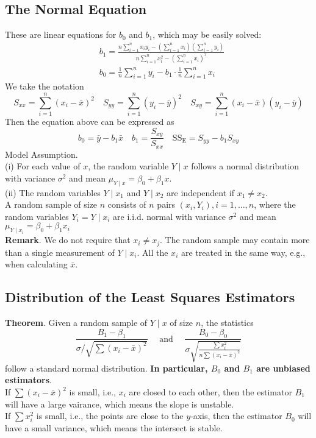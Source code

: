 \documentclass[a4paper,12pt]{article}
\begin{document}
\subsection{The Normal Equation}
These are linear equations for $b_0$ and $b_1$, which may be easily solved:
\begin{equation}
\begin{aligned}
& b_1=\frac{n \sum_{i=1}^n x_i y_i-\left(\sum_{i=1}^n x_i\right)\left(\sum_{i=1}^n y_i\right)}{n \sum_{i=1}^n x_i^2-\left(\sum_{i=1}^n x_i\right)^2} \\
& b_0=\frac{1}{n} \sum_{i=1}^n y_i-b_1 \cdot \frac{1}{n} \sum_{i=1}^n x_i
\end{aligned}
\end{equation}
We take the notation
$$
S_{xx}=\sum_{i=1}^n(x_i-\bar{x})^2 \quad S_{yy}=\sum_{i=1}^n(y_i-\bar{y})^2 \quad S_{xy} =\sum_{i=1}^n(x_i-\bar{x})(y_i-\bar{y})
$$
Then the equation above can be expressed as
\begin{equation}
    b_0=\bar{y}-b_1\bar{x} \quad b_1=\dfrac{S_{xy}}{S_{xx}} \quad \operatorname{SS_E}=S_{yy}-b_1S_{xy}
\end{equation}
Model Assumption.\\
(i) For each value of $x$, the random variable $Y \mid x$ follows a normal distribution with variance $\sigma^2$ and mean $\mu_{Y \mid x}=\beta_0+\beta_1 x$.\\
(ii) The random variables $Y \mid x_1$ and $Y \mid x_2$ are independent if $x_1 \neq x_2$.\\
A random sample of size $n$ consists of $n$ pairs $\left(x_i, Y_i\right), i=1, \ldots, n$, where the random variables $Y_i=Y \mid x_i$ are i.i.d. normal with variance $\sigma^2$ and mean $\mu_{Y \mid x_i}=\beta_0+\beta_1 x_i$\\
\textbf{Remark}. We do not require that $x_i \neq x_j$. The random sample may contain more than a single measurement of $Y \mid x_i$. All the $x_i$ are treated in the same way, e.g., when calculating $\bar{x}$.
\subsection{Distribution of the Least Squares Estimators}
\textbf{Theorem}. Given a random sample of $Y \mid x$ of size $n$, the statistics
\begin{equation}
\frac{B_1-\beta_1}{\sigma / \sqrt{\sum\left(x_i-\bar{x}\right)^2}} \quad \text { and } \quad \frac{B_0-\beta_0}{\sigma \sqrt{\frac{\sum x_i^2}{n \sum\left(x_i-\bar{x}\right)^2}}}
\end{equation}
follow a standard normal distribution.
\textbf{In particular, $B_0$ and $B_1$ are unbiased estimators}.\\
If $\sum(x_i-\bar{x})^2$ is small, i.e., $x_i$ are closed to each other, then the estimator $B_1$ will have a large vairance, which means the slope is unstable.\\
If $\sum x_i^2$ is small, i.e., the points are close to the $y$-axis, then the estimator $B_0$ will have a small variance, which means the intersect is stable.
\end{document}
